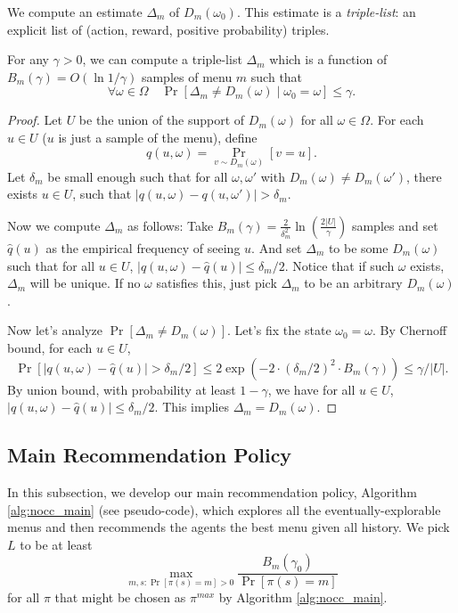 We compute an estimate $\Delta_m$ of $D_m(\omega_0)$. This estimate is a \emph{triple-list}: an explicit list of (action, reward, positive probability) triples.

\begin{lemma}
\label{lem:deltam}
For any $\gamma > 0$, we can compute a triple-list $\Delta_m$ which is a function of
    $B_m(\gamma) = O\left(\ln 1/\gamma \right)$
samples of menu $m$ such that
\[
\forall \omega\in\varOmega \quad
\Pr[\Delta_m \neq D_m(\omega) \mid \omega_0 = \omega] \leq \gamma.
\]
\end{lemma}

\begin{proof}
Let $U$ be the union of the support of $D_m(\omega)$ for all $\omega \in \varOmega$. For each $u \in U$ ($u$ is just a sample of the menu), define
    \[ q(u,\omega) = \Pr_{v \sim D_m(\omega)}[v = u].\]
Let $\delta_m$ be small enough such that for all $\omega, \omega'$ with $D_m(\omega) \neq D_m(\omega')$, there exists $u \in U$, such that $|q(u,\omega) - q(u,\omega')| > \delta_m$.

Now we compute $\Delta_m$ as follows: Take $B_m(\gamma) = \frac{2}{\delta_m^2}\ln\left(\frac{2|U|}{\gamma}\right) $ samples and set $\hat{q}(u)$ as the empirical frequency of seeing $u$. And set $\Delta_m$ to be some $D_m(\omega)$ such that for all $u \in U$, $|q(u,\omega) - \hat{q}(u)| \leq \delta_m / 2$. Notice that if such $\omega$ exists, $\Delta_m$ will be unique. If no $\omega$ satisfies this, just pick $\Delta_m$ to be an arbitrary $D_m(\omega)$.

Now let's analyze $\Pr[\Delta_m \neq D_m(\omega)]$. Let's fix the state $\omega_0 = \omega$. By Chernoff bound, for each $u \in U$,
\[
\Pr[|q(u,\omega) -\hat{q}(u)| > \delta_m/2] \leq 2\exp\left(-2 \cdot
    (\delta_m/2)^2
    \cdot B_m(\gamma)\right) \leq \gamma/|U|.
\]
By union bound, with probability at least $1-\gamma$, we have for all $u \in U$, $|q(u,\omega) - \hat{q}(u)| \leq \delta_m / 2$. This implies $\Delta_m = D_m(\omega)$.
\end{proof}

\subsection{Main Recommendation Policy}
\label{sec:private_main}
In this subsection, we develop our main recommendation policy, Algorithm \ref{alg:nocc_main} (see pseudo-code), which explores all the eventually-explorable menus and then recommends the agents the best menu given all history. We pick $L$ to be at least
\[ \max_{m,s:\Pr[\pi(s)=m] >0} \frac{B_m(\gamma_0)}{ \Pr[\pi(s)=m]}\]
for all $\pi$ that might be chosen as $\pi^{max}$ by Algorithm \ref{alg:nocc_main}.

